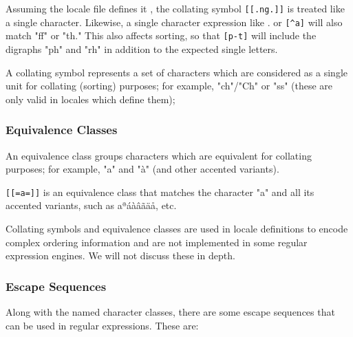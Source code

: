 Assuming the locale file defines it
, the collating symbol
\lstinline|[[.ng.]]|
is treated like a single character. Likewise, a single character expression like . or
\lstinline|[^a]|
will also match "ff" or "th." This also affects sorting, so that
\lstinline|[p-t]|
will include the digraphs "ph" and "rh" in addition to the expected single letters.

A collating symbol represents a set of characters which are considered as a single unit for collating (sorting) purposes; for example, "ch"/"Ch" or "ss" (these are only valid in locales which define them);

\subsubsection{Equivalence Classes}

An equivalence class groups characters which are equivalent for collating purposes; for example, "a" and "à" (and other accented variants).

\lstinline|[[=a=]]| is an equivalence class that matches the character "a" and all its accented variants, such as aªáàâãäå, etc.

Collating symbols and equivalence classes are used in locale definitions to encode complex ordering information and are not implemented in some regular expression engines. We will not discuss these in depth.

\subsubsection{Escape Sequences}

Along with the named character classes, there are some escape sequences that can be used in regular expressions. These are:

